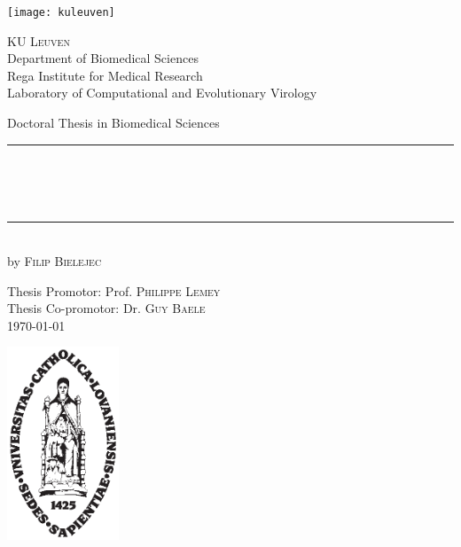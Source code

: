 \begin{titlepage}
	\begin{addmargin}[-1cm]{-3cm}
    \begin{center}
    
    
    \hspace{0.75\textwidth} \texttt{[image: kuleuven]}
    
    
        \large
        {\Large \textsc{KU Leuven}}\\[1ex]
        Department of Biomedical Sciences\\
        Rega Institute for Medical Research\\
        Laboratory of Computational and Evolutionary Virology 

        \vfill

        Doctoral Thesis in Biomedical Sciences\\ \vskip1cm
        \rule{14cm}{0.4pt}\\ \bigskip
        \begingroup
            \Large
            \color{maroon}\spacedallcaps{\myTitle} \\ \bigskip
        \endgroup
        \spacedlowsmallcaps{\mySubtitle} \\ \bigskip
        \rule{14cm}{0.4pt}\\ \vskip1cm
        by \textsc{Filip Bielejec}

        \vfill
        \vfill
        \vfill

        \hfill Thesis Promotor: Prof. \textsc{Philippe Lemey}\\
        \hfill Thesis Co-promotor: Dr. \textsc{Guy Baele}\\
        \hfill \today
    \end{center}
    \vspace{-3.5cm}\includegraphics[width=0.25\textwidth]{figures/sedes}
  \end{addmargin}
\end{titlepage}
